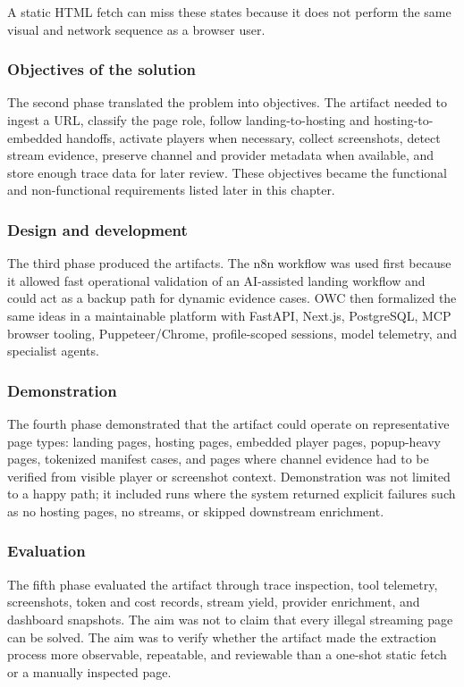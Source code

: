 A static HTML fetch can miss these states because it does not perform the same visual
and network sequence as a browser user.

\subsubsection{Objectives of the solution}

The second phase translated the problem into objectives. The artifact needed to ingest
a URL, classify the page role, follow landing-to-hosting and hosting-to-embedded
handoffs, activate players when necessary, collect screenshots, detect stream evidence,
preserve channel and provider metadata when available, and store enough trace data for
later review. These objectives became the functional and non-functional requirements
listed later in this chapter.

\subsubsection{Design and development}

The third phase produced the artifacts. The n8n workflow was used first because it
allowed fast operational validation of an AI-assisted landing workflow and could act as
a backup path for dynamic evidence cases. OWC then formalized the same ideas in a
maintainable platform with FastAPI, Next.js, PostgreSQL, MCP browser tooling,
Puppeteer/Chrome, profile-scoped sessions, model telemetry, and specialist agents.

\subsubsection{Demonstration}

The fourth phase demonstrated that the artifact could operate on representative page
types: landing pages, hosting pages, embedded player pages, popup-heavy pages,
tokenized manifest cases, and pages where channel evidence had to be verified from
visible player or screenshot context. Demonstration was not limited to a happy path; it
included runs where the system returned explicit failures such as no hosting pages, no
streams, or skipped downstream enrichment.

\subsubsection{Evaluation}

The fifth phase evaluated the artifact through trace inspection, tool telemetry,
screenshots, token and cost records, stream yield, provider enrichment, and dashboard
snapshots. The aim was not to claim that every illegal streaming page can be solved.
The aim was to verify whether the artifact made the extraction process more
observable, repeatable, and reviewable than a one-shot static fetch or a manually
inspected page.

